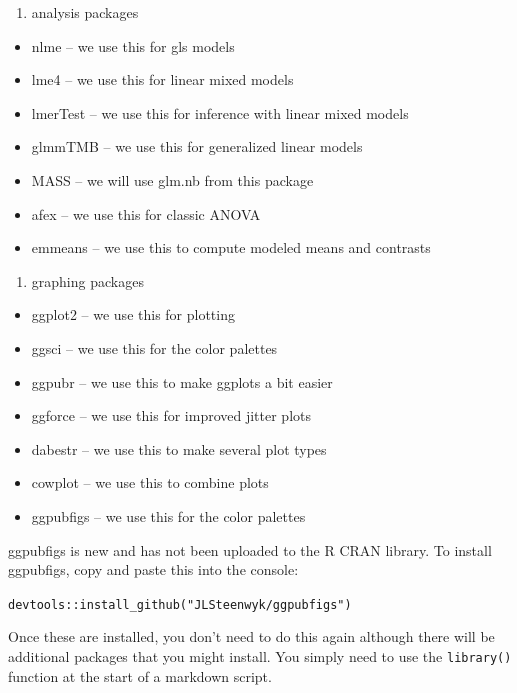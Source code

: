\documentclass[]{book}
\providecommand{\tightlist}{%
  \setlength{\itemsep}{0pt}\setlength{\parskip}{0pt}}
\begin{document}
\begin{enumerate}
\def\labelenumi{\arabic{enumi}.}
\setcounter{enumi}{1}
\tightlist
\item
  analysis packages
\end{enumerate}

\begin{itemize}
\tightlist
\item
  nlme -- we use this for gls models
\item
  lme4 -- we use this for linear mixed models
\item
  lmerTest -- we use this for inference with linear mixed models
\item
  glmmTMB -- we use this for generalized linear models
\item
  MASS -- we will use glm.nb from this package
\item
  afex -- we use this for classic ANOVA
\item
  emmeans -- we use this to compute modeled means and contrasts
\end{itemize}

\begin{enumerate}
\def\labelenumi{\arabic{enumi}.}
\setcounter{enumi}{2}
\tightlist
\item
  graphing packages
\end{enumerate}

\begin{itemize}
\tightlist
\item
  ggplot2 -- we use this for plotting
\item
  ggsci -- we use this for the color palettes
\item
  ggpubr -- we use this to make ggplots a bit easier
\item
  ggforce -- we use this for improved jitter plots
\item
  dabestr -- we use this to make several plot types
\item
  cowplot -- we use this to combine plots
\item
  ggpubfigs -- we use this for the color palettes
\end{itemize}

ggpubfigs is new and has not been uploaded to the R CRAN library. To install ggpubfigs, copy and paste this into the console:

\texttt{devtools::install\_github("JLSteenwyk/ggpubfigs")}

Once these are installed, you don't need to do this again although there will be additional packages that you might install. You simply need to use the \texttt{library()} function at the start of a markdown script.
\end{document}
